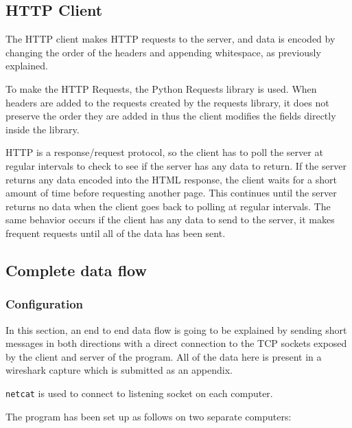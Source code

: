 \subsection{HTTP Client}
The HTTP client makes HTTP requests to the server, and data is encoded by changing the order of the headers and appending whitespace, as previously explained.\par
To make the HTTP Requests, the Python Requests library is used. When headers are added to the requests created by the requests library, it does not preserve the order they are added in thus the client modifies the fields directly inside the library.\par
HTTP is a response/request protocol, so the client has to poll the server at regular intervals to check to see if the server has any data to return. If the server returns any data encoded into the HTML response, the client waits for a short amount of time before requesting another page. This continues until the server returns no data when the client goes back to polling at regular intervals. The same behavior occurs if the client has any data to send to the server, it makes frequent requests until all of the data has been sent.

\subsection{Complete data flow}
\subsubsection{Configuration}
In this section, an end to end data flow is going to be explained by sending short messages in both directions with a direct connection to the TCP sockets exposed by the client and server of the program. All of the data here is present in a wireshark capture which is submitted as an appendix.\par
\vspace{0.2cm}

\texttt{netcat} is used to connect to listening socket on each computer.\par
\vspace{0.2cm}

The program has been set up as follows on two separate computers:

